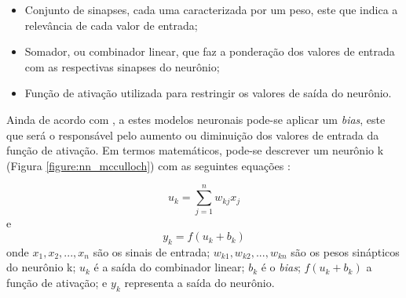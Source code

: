 \begin{itemize}
	\item Conjunto de sinapses, cada uma caracterizada por um peso, este que indica a relevância de cada valor de entrada;
	\item Somador, ou combinador linear, que faz a ponderação dos valores de entrada com as respectivas sinapses do neurônio;
	\item Função de ativação utilizada para restringir os valores de saída do neurônio.
\end{itemize}

\par Ainda de acordo com , a estes modelos neuronais pode-se aplicar um \textit{bias}, este que será o responsável pelo aumento ou diminuição dos valores de entrada da função de ativação. Em termos matemáticos, pode-se descrever um neurônio k (Figura \ref{figure:nn_mcculloch}) com as seguintes equações \cite{Haykin2001}:

\begin{equation}
	u_{k} = \sum_{j=1}^{n} w_{kj} x_{j}
\end{equation}
e
\begin{equation}
	y_{k} = f(u_{k} + b_{k})	
\end{equation}
onde $ x_{1}, x_{2}, ..., x_{n} $ são os sinais de entrada; $ w_{k1}, w_{k2}, ..., w_{kn} $ são os pesos sinápticos do neurônio k; $ u_{k} $ é a saída do combinador linear; $ b_{k} $ é o \textit{bias}; $ f(u_{k} + b_{k}) $ a função de ativação; e $ y_{k} $ representa a saída do neurônio.


